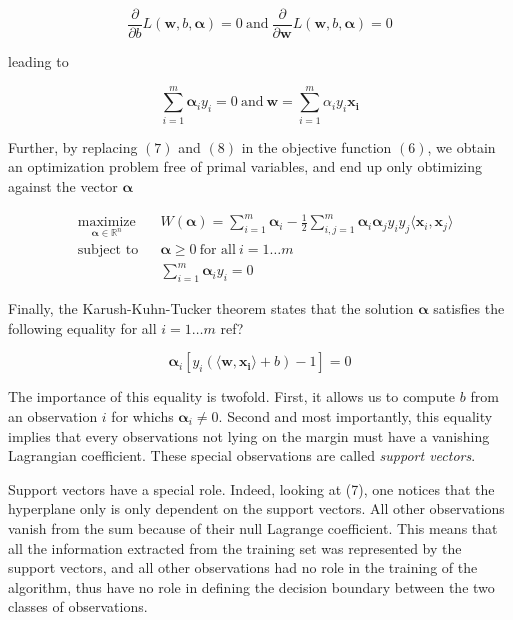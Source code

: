 \begin{equation}
  \frac{\partial}{\partial b}L(\mathbf{w}, b, \boldsymbol{\alpha}) = 0
  \ \text{and}\ 
  \frac{\partial}{\partial \mathbf{w}}L(\mathbf{w}, b, \boldsymbol{\alpha}) = 0
\end{equation}

leading to

\begin{equation}
  \sum^m_{i=1} \boldsymbol{\alpha}_iy_i = 0
  \ \text{and}\ 
  \mathbf{w} = \sum^m_{i=1} \alpha_iy_i\mathbf{x_i}
\end{equation}

Further, by replacing $(7)$ and $(8)$ in the objective function $(6)$, we obtain an optimization problem free of primal variables, and end up only obtimizing against the vector $\boldsymbol{\alpha}$

\begin{equation}
  \begin{aligned}
    &\underset{\boldsymbol{\alpha} \in \mathbb{R}^n} {\text{maximize}}
    & & W(\boldsymbol{\alpha}) = \sum_{i=1}^m\boldsymbol{\alpha}_i - \frac{1}{2}\sum_{i,j=1}^m\boldsymbol{\alpha}_i\boldsymbol{\alpha}_jy_iy_j\langle\mathbf{x}_i, \mathbf{x}_j\rangle\\
    &\text{subject to}
    & &\boldsymbol{\alpha} \ge 0\ \text{for all}\ i = 1 \dotsc m\\
    & & &\sum^m_{i=1} \boldsymbol{\alpha}_iy_i = 0
  \end{aligned}
\end{equation}

Finally, the Karush-Kuhn-Tucker theorem states that the solution $\boldsymbol{\alpha}$ satisfies the following equality for all $i = 1\dotsc m$
\textcolor[rgb]{1,0,0}{ref?}

\begin{equation}
  \boldsymbol{\alpha}_i[y_i(\langle \mathbf{w}, \mathbf{x_i}\rangle + b) - 1] = 0
\end{equation}

The importance of this equality is twofold. First, it allows us to compute $b$ from an observation $i$ for whichs $\boldsymbol{\alpha}_i \neq 0$. Second and most importantly, this equality implies that every observations not lying on the margin must have a vanishing Lagrangian coefficient. These special observations are called \textit{support vectors}.

Support vectors have a special role. Indeed, looking at (7), one notices that the hyperplane only is only dependent on the support vectors. All other observations vanish from the sum because of their null Lagrange coefficient. This means that all the information extracted from the training set was represented by the support vectors, and all other observations had no role in the training of the algorithm, thus have no role in defining the decision boundary between the two classes of observations.

